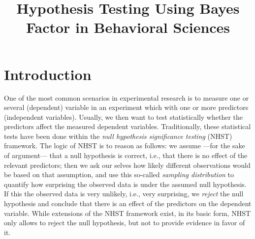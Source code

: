 \documentclass[
  doc,
  floatsintext,
  longtable,
  nolmodern,
  notxfonts,
  notimes,
  colorlinks=true,linkcolor=blue,citecolor=blue,urlcolor=blue]{apa7}
\title{Hypothesis Testing Using Bayes Factor in Behavioral Sciences}
\begin{document}
\maketitle



\setcounter{secnumdepth}{3}

\setlength\LTleft{0pt}




\section{Introduction}\label{introduction}

One of the most common scenarios in experimental research is to measure
one or several (dependent) variable in an experiment which with one or
more predictors (independent variables). Usually, we then want to test
statistically whether the predictors affect the measured dependent
variables. Traditionally, these statistical tests have been done within
the \emph{null hypothesis significance testing} (NHST) framework. The
logic of NHST is to reason as follows: we assume ---for the sake of
argument--- that a null hypothesis is correct, i.e., that there is no
effect of the relevant predictors; then we ask our selves how likely
different observations would be based on that assumption, and use this
so-called \emph{sampling distribution} to quantify how surprising the
observed data is under the assumed null hypothesis. If this the observed
data is very unlikely, i.e., very surprising, we \emph{reject} the null
hypothesis and conclude that there is an effect of the predictors on the
dependent variable. While extensions of the NHST framework exist, in its
basic form, NHST only allows to reject the null hypothesis, but not to
provide evidence in favor of it.
\end{document}

